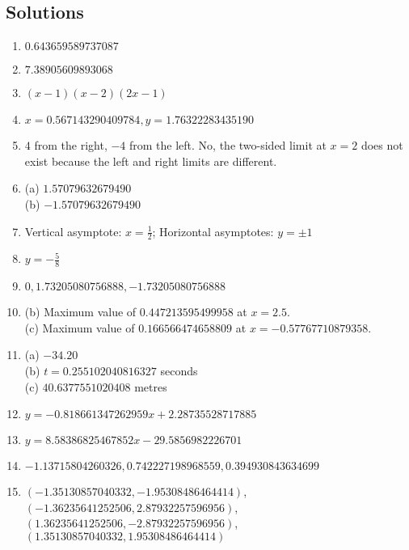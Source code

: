 \clearpage

\subsection{Solutions}

\begin{enumerate}
    \item $0.643659589737087$
    \item $7.38905609893068$
    \item $\left(x-1\right) \left(x-2\right) \left(2 x-1\right)$
    \item $x= 0.567143290409784, y= 1.76322283435190$
    \item $4$ from the right, $-4$ from the left. No, the two-sided limit at $x = 2$ does not exist because the left and right limits are different.
    \item (a) $1.57079632679490$\\ (b) $-1.57079632679490$
    \item Vertical asymptote: $x=\frac{1}{2}$; Horizontal asymptotes: $y=\pm 1$
    \item $y=-\frac{5}{8}$
    \item $0, 1.73205080756888,- 1.73205080756888$
    \item (b) Maximum value of $0.447213595499958$ at $x=2.5$. \\(c) Maximum value of $0.166566474658809$ at $x=-0.57767710879358$.
    \item (a) $- 34.20$ \\(b) $t=0.255102040816327$ seconds \\(c) $40.6377551020408$ metres
    \item $y=-0.818661347262959 x + 2.28735528717885$
    \item $y=8.58386825467852 x - 29.5856982226701$
    \item $-1.13715804260326, 0.742227198968559, 0.394930843634699$
    \item $(-1.35130857040332, -1.95308486464414)$, $(-1.36235641252506, 2.87932257596956)$, $(1.36235641252506, -2.87932257596956)$, $(1.35130857040332, 1.95308486464414)$
\end{enumerate}